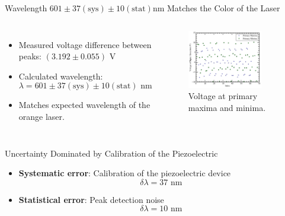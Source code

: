 \documentclass[aspectratio = 169]{beamer}
\begin{document}
\begin{frame}{Wavelength $601\pm37(\text{sys})\pm10(\text{stat})\text{nm}$ Matches the Color of the Laser}
\begin{columns}
    \begin{itemize}
        \item Measured voltage difference between peaks: $(3.192 \pm 0.055) \text{ V}$
        \item Calculated wavelength:
        \[
        \lambda = 601\pm37(\text{sys})\pm10(\text{stat})\text{ nm}
        \]
        \item Matches expected wavelength of the orange laser.
    \end{itemize}
        \begin{figure}
        \centering
        \includegraphics[width=0.8\textwidth]{fig/Primary_Maxima_Minima.png}
    \caption{Voltage at primary maxima and minima.}
    \end{figure}
\end{columns}
\end{frame}

\begin{frame}{Uncertainty Dominated by Calibration of the Piezoelectric}
    \begin{itemize}
        \item \textbf{Systematic error}: Calibration of the piezoelectric device
        \[
        \delta \lambda = 37 \text{ nm}
        \]
        \item \textbf{Statistical error}: Peak detection noise
        \[
        \delta \lambda = 10 \text{ nm}
        \]
    \end{itemize}
\end{frame}
\end{document}
